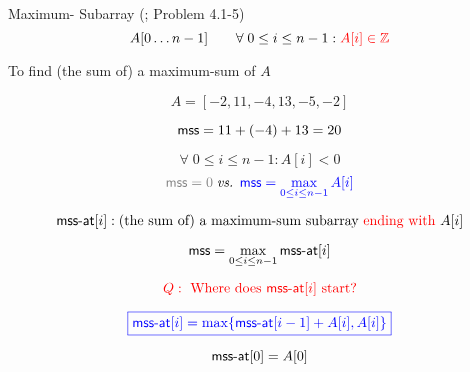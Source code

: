 
\begin{frame}{}
  \begin{exampleblock}{Maximum- Subarray (\mss; Problem 4.1-5)}
    \[
      A[0 \ldots n-1] \qquad \forall\; 0 \le i \le n-1: \textcolor{red}{A[i] \in \mathbb{Z}}
    \]

    \pause
    \begin{center}
      To find (the sum of) a maximum-sum  of $A$
    \end{center}
  \end{exampleblock}

  \pause
  \[
    A = [-2, 11, -4, 13, -5, -2]
  \]

  \pause
  \vspace{-0.30cm}
  \[
    \textsf{mss} = 11 + (-4) + 13 = 20
  \]
  


  \pause
  \[
    \forall\; 0 \le i \le n - 1: A[i] < 0 
  \]
  \[
    \textcolor{gray}{\mss = 0} \;\text{\it vs. } \blue{\mss = \max\limits_{0 \le i \le n-1} A[i]}
  \]
\end{frame}

% 
% 
%   

\begin{frame}{}
  \[
    \textsf{mss-at}[i]: \text{(the sum of) a maximum-sum subarray \textcolor{red}{ending with }} A[i]
  \]

  \pause
  \[
    \textsf{mss} = \max_{0 \le i \le n-1} \textsf{mss-at}[i]
  \]

  \pause
  \[
    \textcolor{red}{Q: \text{ Where does } \textsf{mss-at}[i] \text{ start}?}
  \]

  \pause
  \[
    \textcolor{blue}{\boxed{\textsf{mss-at}[i] = \max \{\textsf{mss-at}[i-1] + A[i], A[i]\}}}
  \]

  \pause
  \[
    \textsf{mss-at}[0] = A[0]
  \]

\end{frame}

